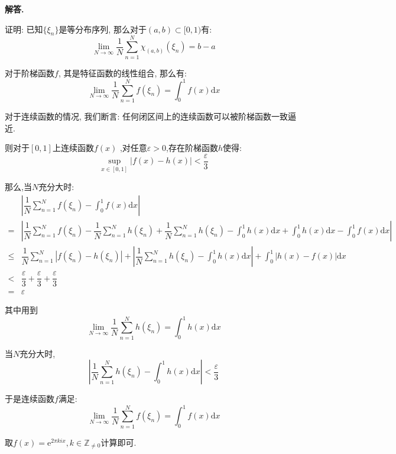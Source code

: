 \documentclass[12pt, a4paper, oneside]{ctexart}
\newenvironment{solution}{\par\noindent\textbf{解答. }}{\par}
\begin{document}
\begin{solution}
\par
证明: 已知$\{\xi_n\}$是等分布序列, 那么对于$(a,b)\subset [0,1)$有:
$$
\lim_{N \to \infty}\dfrac{1}{N}\sum_{n=1}^{N}\chi_{(a,b)}(\xi_n)=b-a
$$
\par
对于阶梯函数$f$, 其是特征函数的线性组合, 那么有:
$$
\lim_{N \to \infty}\dfrac{1}{N}\sum_{n=1}^{N}f(\xi_n)=\int_{0}^{1}f(x)\mathrm{d}x
$$
\par
对于连续函数的情况, 我们断言: 任何闭区间上的连续函数可以被阶梯函数一致逼近.
\par
则对于$[0,1]$上连续函数$f(x)$ ,对任意$\varepsilon>0$,存在阶梯函数$h$使得:
$$
\sup_{x\in[0,1]}|f(x)-h(x)|<\dfrac{\varepsilon}{3}
$$
\par
那么,当$N$充分大时:
$$
\begin{aligned}
&\left|\dfrac{1}{N}\sum_{n=1}^{N}f(\xi_n)-\int_{0}^{1}f(x)\mathrm{d}x\right|\\
=&\left|\dfrac{1}{N}\sum_{n=1}^{N}f(\xi_n)
-\dfrac{1}{N}\sum_{n=1}^{N}h(\xi_n)
+\dfrac{1}{N}\sum_{n=1}^{N}h(\xi_n)-\int_{0}^{1}h(x)\mathrm{d}x
+\int_{0}^{1}h(x)\mathrm{d}x-\int_{0}^{1}f(x)\mathrm{d}x\right|\\
\leqslant &\dfrac{1}{N}\sum_{n=1}^{N}|f(\xi_n)-h(\xi_n)|
+\left|\dfrac{1}{N}\sum_{n=1}^{N}h(\xi_n)-\int_{0}^{1}h(x)\mathrm{d}x\right|
+\int_{0}^{1}|h(x)-f(x)|\mathrm{d}x\\
<&\dfrac{\varepsilon}{3}+\dfrac{\varepsilon}{3}+\dfrac{\varepsilon}{3}\\
=&\varepsilon
\end{aligned}
$$
\par
其中用到$$
\lim_{N \to \infty}\dfrac{1}{N}\sum_{n=1}^{N}h(\xi_n)=\int_{0}^{1}h(x)\mathrm{d}x
$$
\par
当$N$充分大时, $$
\left|\dfrac{1}{N}\sum_{n=1}^{N}h(\xi_n)-\int_{0}^{1}h(x)\mathrm{d}x\right|<\dfrac{\varepsilon}{3}
$$
\par
\quad
\par
于是连续函数$f$满足:
$$
\lim_{N \to \infty}\dfrac{1}{N}\sum_{n=1}^{N}f(\xi_n)=\int_{0}^{1}f(x)\mathrm{d}x
$$
\par
取$f(x)=\mathrm{e}^{2\pi k i x}, k\in \mathbb{Z}_{\neq 0}$计算即可.
\end{solution}

\par
\quad
\par
\end{document}
